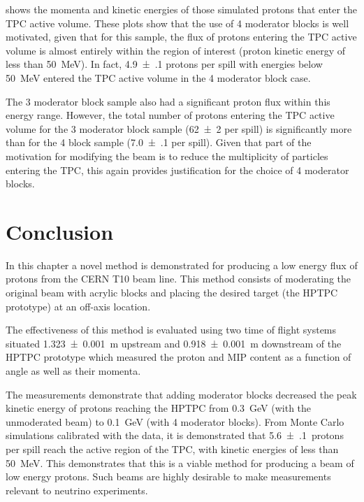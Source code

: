  shows the momenta and kinetic energies of those simulated protons that enter the TPC active volume.
These plots show that the use of 4 moderator blocks is well motivated, given that for this sample, the flux of protons entering the TPC active volume is almost entirely within the region of interest (proton kinetic energy of less than \SI{50}{\mega\electronvolt}).
In fact, \num{4.9(1)} protons per spill with energies below \SI{50}{\mega\electronvolt} entered the TPC active volume in the 4 moderator block case.

The 3 moderator block sample also had a significant proton flux within this energy range.
However, the total number of protons entering the TPC active volume for the 3 moderator block sample (\num{62(2)} per spill) is significantly more than for the 4 block sample (\num{7.0(1)} per spill).
Given that part of the motivation for modifying the beam is to reduce the multiplicity of particles entering the TPC, this again provides justification for the choice of 4 moderator blocks.

\section{Conclusion}

In this chapter a novel method is demonstrated for producing a low energy flux of protons from the CERN T10 beam line.
This method consists of moderating the original beam with acrylic blocks and placing the desired target (the HPTPC prototype) at an off-axis location.

The effectiveness of this method is evaluated using two time of flight systems situated \SI{1.323(1)}{\m} upstream and \SI{0.918(1)}{\m} downstream of the HPTPC prototype which measured the proton and MIP content as a function of angle as well as their momenta.

The measurements demonstrate that adding moderator blocks decreased the peak kinetic energy of protons reaching the HPTPC from \SI{0.3}{\GeV} (with the unmoderated beam) to \SI{0.1}{\GeV} (with 4 moderator blocks).
From Monte Carlo simulations calibrated with the data, it is demonstrated that \num{5.6(1)}~protons per spill reach the active region of the TPC, with kinetic energies of less than \SI{50}{\MeV}.
This demonstrates that this is a viable method for producing a beam of low energy protons. 
Such beams are highly desirable to make measurements relevant to neutrino experiments.
